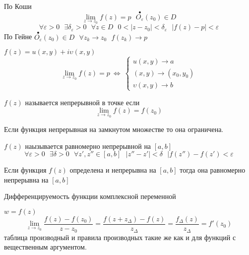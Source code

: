 \begin{define}
  По Коши
  $$
  \lim_{z \to z_0} f(z) = p ~~~ \stackrel{\bullet}{O_{\varepsilon}}(z_0) \in D
  $$
  $$
  \forall \varepsilon > 0 ~~~ \exists \delta_{\varepsilon} > 0 ~~~
  \forall z \in D ~~~ 0 < |z - z_0| < \delta_{\varepsilon} ~~~
  |f(z) - p| < \varepsilon
  $$
  По Гейне
  $\stackrel{\bullet}{O_{\varepsilon}}(z_0) \in D ~~~ \forall z_k \to z_0 ~~~
  f(z_k) \to p$
\end{define}

\begin{block}
  $f(z) = u(x, y) + i\upsilon(x,y)$
  $$
  \lim_{z \to z_0} f(z) = p ~ \Leftrightarrow ~
  \left\{
  \begin{array}{l}
    u(x,y) \to a \\
    (x,y) \to (x_0, y_0) \\
    \upsilon(x,y) \to b
  \end{array}
  \right.
  $$
\end{block}

\begin{define}
  $f(z)$ называется непрерывной в точке если
  $$
  \lim_{z \to z_0} f(z) = f(z_0)
  $$
\end{define}

\begin{theorem}[Вейерштрасса]
  Если функция непрерывная на замкнутом множестве то она ограничена.
\end{theorem}

\begin{theorem}
  $f(z)$ наызывается равномерно непрерывной на $[a,b]$
  $$
  \forall \varepsilon > 0 ~~~ \exists \delta > 0 ~~~ \forall z', z'' \in [a,b]
  ~~~ |z'' - z'| < \delta ~~~ |f(z'') - f(z') < \varepsilon
  $$
\end{theorem}

\begin{theorem}[Кантора]
  Если функция $f(z)$ определена и непрерывна на $[a,b]$ тогда она равномерно
  непрерывна на $[a,b]$
\end{theorem}

\begin{title}[\Large]
  Дифференцируемость функции комплексной переменной
\end{title}

\begin{define}
  $w = f(z)$
  $$
  \lim_{z \to z_0} \frac{f(z) - f(z_0)}{z - z_0} =
  \frac{f(z + z_{\Delta}) - f(z)}{z_{\Delta}} =
  \frac{f_{\Delta}(z)}{z_{\Delta}} = f'(z_0)
  $$
  таблица производный и правила производных такие же как и для функций с
  вещественным аргументом.
\end{define}

